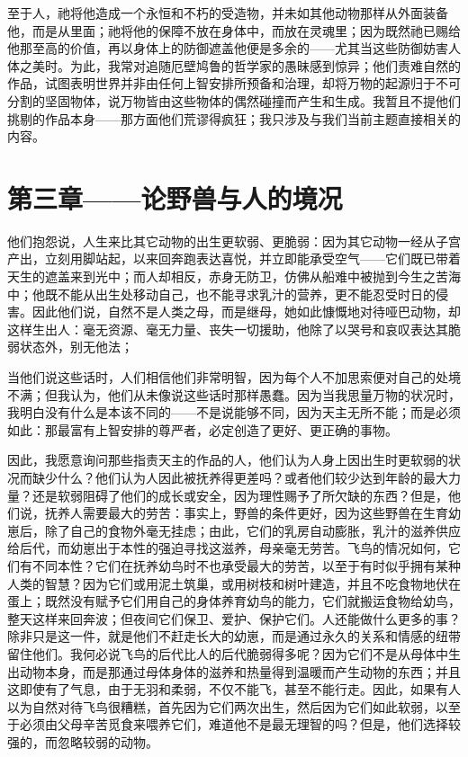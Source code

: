 至于人，祂将他造成一个永恒和不朽的受造物，并未如其他动物那样从外面装备他，而是从里面；祂将他的保障不放在身体中，而放在灵魂里；因为既然祂已赐给他那至高的价值，再以身体上的防御遮盖他便是多余的——尤其当这些防御妨害人体之美时。为此，我常对追随厄壁鸠鲁的哲学家的愚昧感到惊异；他们责难自然的作品，试图表明世界并非由任何上智安排所预备和治理，却将万物的起源归于不可分割的坚固物体，说万物皆由这些物体的偶然碰撞而产生和生成。我暂且不提他们挑剔的作品本身——那方面他们荒谬得疯狂；我只涉及与我们当前主题直接相关的内容。\par


\section{第三章——论野兽与人的境况}

他们抱怨说，人生来比其它动物的出生更软弱、更脆弱：因为其它动物一经从子宫产出，立刻用脚站起，以来回奔跑表达喜悦，并立即能承受空气——它们既已带着天生的遮盖来到光中；而人却相反，赤身无防卫，仿佛从船难中被抛到今生之苦海中；他既不能从出生处移动自己，也不能寻求乳汁的营养，更不能忍受时日的侵害。因此他们说，自然不是人类之母，而是继母，她如此慷慨地对待哑巴动物，却这样生出人：毫无资源、毫无力量、丧失一切援助，他除了以哭号和哀叹表达其脆弱状态外，别无他法；\par

当他们说这些话时，人们相信他们非常明智，因为每个人不加思索便对自己的处境不满；但我认为，他们从未像说这些话时那样愚蠢。因为当我思量万物的状况时，我明白没有什么是本该不同的——不是说能够不同，因为天主无所不能；而是必须如此：那最富有上智安排的尊严者，必定创造了更好、更正确的事物。\par

因此，我愿意询问那些指责天主的作品的人，他们认为人身上因出生时更软弱的状况而缺少什么？他们认为人因此被抚养得更差吗？或者他们较少达到年龄的最大力量？还是软弱阻碍了他们的成长或安全，因为理性赐予了所欠缺的东西？但是，他们说，抚养人需要最大的劳苦：事实上，野兽的条件更好，因为这些野兽在生育幼崽后，除了自己的食物外毫无挂虑；由此，它们的乳房自动膨胀，乳汁的滋养供应给后代，而幼崽出于本性的强迫寻找这滋养，母亲毫无劳苦。飞鸟的情况如何，它们有不同本性？它们在抚养幼鸟时不也承受最大的劳苦，以至于有时似乎拥有某种人类的智慧？因为它们或用泥土筑巢，或用树枝和树叶建造，并且不吃食物地伏在蛋上；既然没有赋予它们用自己的身体养育幼鸟的能力，它们就搬运食物给幼鸟，整天这样来回奔波；但夜间它们保卫、爱护、保护它们。人还能做什么更多的事？除非只是这一件，就是他们不赶走长大的幼崽，而是通过永久的关系和情感的纽带留住他们。我何必说飞鸟的后代比人的后代脆弱得多呢？因为它们不是从母体中生出动物本身，而是那通过母体身体的滋养和热量得到温暖而产生动物的东西；并且这即使有了气息，由于无羽和柔弱，不仅不能飞，甚至不能行走。因此，如果有人以为自然对待飞鸟很糟糕，首先因为它们两次出生，然后因为它们如此软弱，以至于必须由父母辛苦觅食来喂养它们，难道他不是最无理智的吗？但是，他们选择较强的，而忽略较弱的动物。\par


